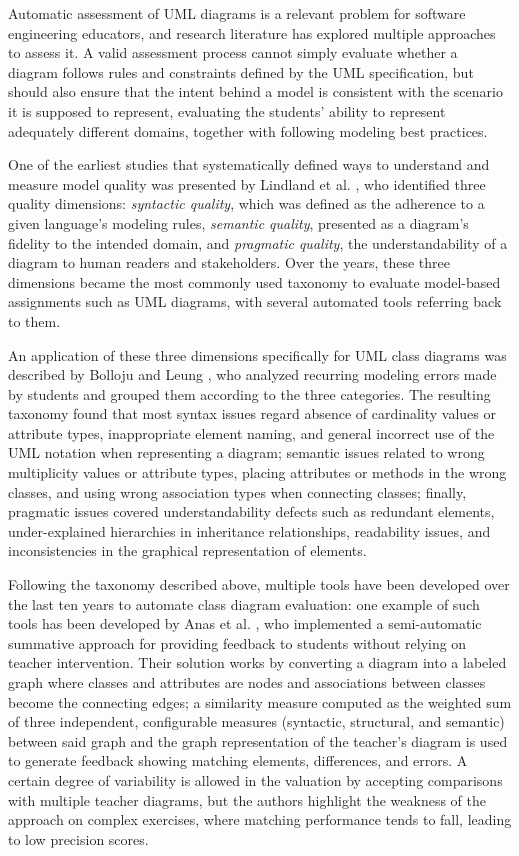Automatic assessment of UML diagrams is a relevant problem for software engineering educators, and research literature has explored multiple approaches to assess it. A valid assessment process cannot simply evaluate whether a diagram follows rules and constraints defined by the UML specification, but should also ensure that the intent behind a model is consistent with the scenario it is supposed to represent, evaluating the students' ability to represent adequately different domains, together with following modeling best practices.

One of the earliest studies that systematically defined ways to understand and measure model quality was presented by Lindland et al. \cite{lindland1994understanding}, who identified three quality dimensions: \textit{syntactic quality}, which was defined as the adherence to a given language's modeling rules, \textit{semantic quality}, presented as a diagram's fidelity to the intended domain, and \textit{pragmatic quality}, the understandability of a diagram to human readers and stakeholders. Over the years, these three dimensions became the most commonly used taxonomy to evaluate model-based assignments such as UML diagrams, with several automated tools referring back to them. 

An application of these three dimensions specifically for UML class diagrams was described by Bolloju and Leung \cite{bolloju2006assisting}, who analyzed recurring modeling errors made by students and grouped them according to the three categories. The resulting taxonomy found that most syntax issues regard absence of cardinality values or attribute types, inappropriate element naming, and general incorrect use of the UML notation when representing a diagram; semantic issues related to wrong multiplicity values or attribute types, placing attributes or methods in the wrong classes, and using wrong association types when connecting classes; finally, pragmatic issues covered understandability defects such as redundant elements, under-explained hierarchies in inheritance relationships, readability issues, and inconsistencies in the graphical representation of elements.

Following the taxonomy described above, multiple tools have been developed over the last ten years to automate class diagram evaluation: one example of such tools has been developed by Anas et al. \cite{anas2021newmethod}, who implemented a semi-automatic summative approach for providing feedback to students without relying on teacher intervention. Their solution works by converting a diagram into a labeled graph where classes and attributes are nodes and associations between classes become the connecting edges; a similarity measure computed as the weighted sum of three independent, configurable measures (syntactic, structural, and semantic) between said graph and the graph representation of the teacher's diagram is used to generate feedback showing matching elements, differences, and errors. A certain degree of variability is allowed in the valuation by accepting comparisons with multiple teacher diagrams, but the authors highlight the weakness of the approach on complex exercises, where matching performance tends to fall, leading to low precision scores.

